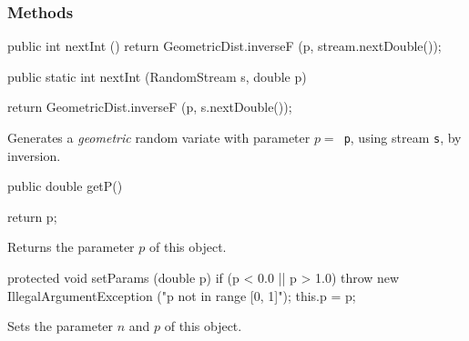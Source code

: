 \subsubsection* {Methods}
\begin{code}\begin{hide} 
    
   public int nextInt () {
      return GeometricDist.inverseF (p, stream.nextDouble());
   }\end{hide}

   public static int nextInt (RandomStream s, double p) \begin{hide} {
      return GeometricDist.inverseF (p, s.nextDouble());
   }\end{hide}
\end{code}
\begin{tabb} Generates a {\em geometric\/} random variate with parameter
  $p = $~\texttt{p}, using stream \texttt{s}, by inversion.
\end{tabb}
\begin{code}

   public double getP()\begin{hide} {
      return p;
   }\end{hide}
\end{code}
\begin{tabb} Returns the parameter $p$ of this object.
\end{tabb}
\begin{hide}\begin{code}

   protected void setParams (double p) {
      if (p < 0.0 || p > 1.0)
         throw new IllegalArgumentException ("p not in range [0, 1]");
      this.p = p;
   }
\end{code}
\begin{tabb} Sets the parameter $n$ and $p$ of this object.
\end{tabb}
\begin{code}
}
\end{code}
\end{hide}
